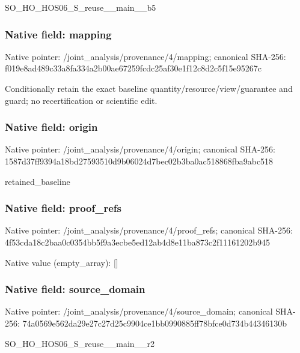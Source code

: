 \documentclass[10pt,a4paper]{article}
\begin{document}
\begingroup\raggedright\sloppy SO\_\allowbreak{}HO\_\allowbreak{}HOS06\_\allowbreak{}S\_\allowbreak{}reuse\_\allowbreak{}\_\allowbreak{}main\_\allowbreak{}\_\allowbreak{}b5\par\endgroup

\subsubsection{Native field: mapping}
Native pointer: /joint\_\allowbreak{}analysis/provenance/4/mapping; canonical SHA-256: f019e8ad489c33a8fa334a2b00ae67259fcdc25af30e1f12c8d2c5f15e95267c

\begingroup\raggedright\sloppy Conditionally retain the exact baseline quantity/\allowbreak{}resource/\allowbreak{}view/\allowbreak{}guarantee and guard;\allowbreak{} no recertification or scientific edit.\par\endgroup

\subsubsection{Native field: origin}
Native pointer: /joint\_\allowbreak{}analysis/provenance/4/origin; canonical SHA-256: 1587d37ff9394a18bd27593510d9b06024d7bec02b3ba0ac518868fba9abc518

\begingroup\raggedright\sloppy retained\_\allowbreak{}baseline\par\endgroup

\subsubsection{Native field: proof\_\allowbreak{}refs}
Native pointer: /joint\_\allowbreak{}analysis/provenance/4/proof\_\allowbreak{}refs; canonical SHA-256: 4f53cda18c2baa0c0354bb5f9a3ecbe5ed12ab4d8e11ba873c2f11161202b945

Native value (empty\_\allowbreak{}array): []

\subsubsection{Native field: source\_\allowbreak{}domain}
Native pointer: /joint\_\allowbreak{}analysis/provenance/4/source\_\allowbreak{}domain; canonical SHA-256: 74a0569e562da29e27c27d25c9904ce1bb0990885ff78bfce0d734b44346130b

\begingroup\raggedright\sloppy SO\_\allowbreak{}HO\_\allowbreak{}HOS06\_\allowbreak{}S\_\allowbreak{}reuse\_\allowbreak{}\_\allowbreak{}main\_\allowbreak{}\_\allowbreak{}r2\par\endgroup
\end{document}
